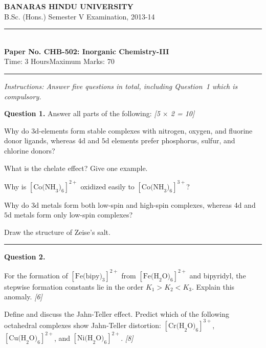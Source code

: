 \documentclass[11pt,a4paper]{article}
\newcommand{\pts}[1]{\hfill   \textit{[#1]}}
\begin{document}
\begin{center}
  {\large\bfseries BANARAS HINDU UNIVERSITY}\\[2pt]
  {\normalsize B.Sc. (Hons.) Semester V Examination, 2013-14}\\[6pt]
  \rule{0.8\linewidth}{0.5pt}\\[6pt]
  {\large\bfseries Paper No. CHB-502: Inorganic Chemistry-III}\\[4pt]
  {\normalsize Time: 3 Hours\hfill Maximum Marks: 70}
\end{center}
\rule{\linewidth}{0.4pt}
\small



\noindent   \textit{Instructions: Answer five questions in total, including Question~1 which is compulsory.}

\normalsize
\bigskip




\noindent   \textbf{Question 1.} Answer all parts of the following: \pts{5 $ \times$ 2 = 10}

\begin{parts}
  \item Why do $3 \text{d}$-elements form stable complexes with nitrogen, oxygen, and fluorine donor ligands, whereas $4 \text{d}$ and $5 \text{d}$ elements prefer phosphorus, sulfur, and chlorine donors?
  \item What is the chelate effect? Give one example.
  \item Why is $[ \text{Co(NH}_3)_6]^{2+}$ oxidized easily to $[ \text{Co(NH}_3)_6]^{3+}$?
  \item Why do $3 \text{d}$ metals form both low-spin and high-spin complexes, whereas $4 \text{d}$ and $5 \text{d}$ metals form only low-spin complexes?
  \item Draw the structure of Zeise's salt.
\end{parts}

\medskip\rule{\linewidth}{0.2pt}




\noindent   \textbf{Question 2.}

\begin{parts}
  \item For the formation of $[ \text{Fe(bipy)}_3]^{2+}$ from $[ \text{Fe(H}_2 \text{O)}_6]^{2+}$ and bipyridyl, the stepwise formation constants lie in the order $K_1 > K_2 < K_3$. Explain this anomaly. \pts{6}
  \item Define and discuss the Jahn-Teller effect. Predict which of the following octahedral complexes show Jahn-Teller distortion: $[ \text{Cr(H}_2 \text{O)}_6]^{3+}$, $[ \text{Cu(H}_2 \text{O)}_6]^{2+}$, and $[ \text{Ni(H}_2 \text{O)}_6]^{2+}$. \pts{8}
\end{parts}
\end{document}
